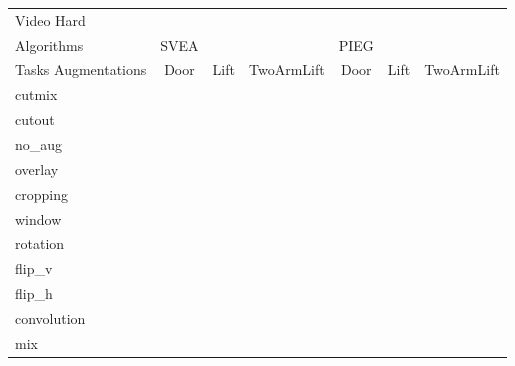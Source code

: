 \begin{tabular}{lcccccc}
Video Hard & & & & & & \\
Algorithms & SVEA & & & PIEG & & \\
Tasks Augmentations & Door & Lift & TwoArmLift & Door & Lift & TwoArmLift \\
cutmix          &  &  &  &  &  &  \\
cutout          &  &  &  &  &  &  \\
no\_aug         &  &  &  &  &  &  \\
overlay         &  &  &  &  &  &  \\
cropping        &  &  &  &  &  &  \\
window          &  &  &  &  &  &  \\
rotation        &  &  &  &  &  &  \\
flip\_v         &  &  &  &  &  &  \\
flip\_h         &  &  &  &  &  &  \\
convolution     &  &  &  &  &  &  \\
mix             &  &  &  &  &  &  \\
\end{tabular}